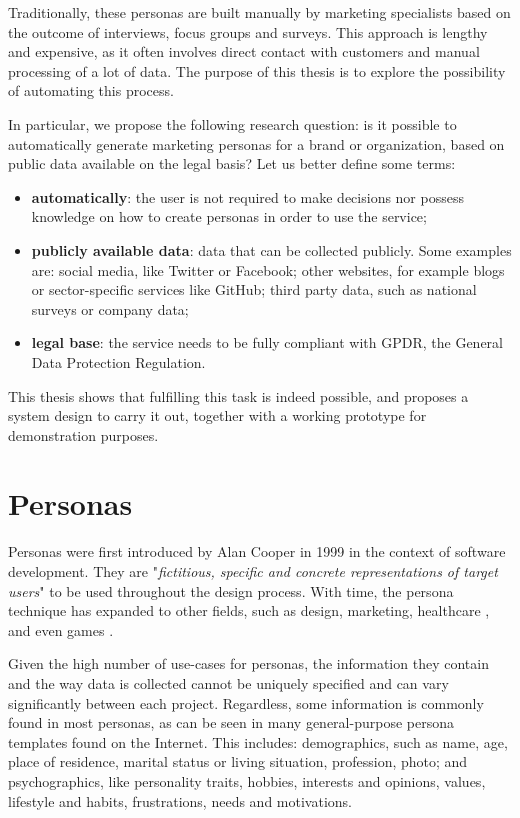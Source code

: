 Traditionally, these personas are built manually by marketing specialists based on the outcome of interviews, focus groups and surveys. This approach is lengthy and expensive, as it often involves direct contact with customers and manual processing of a lot of data. The purpose of this thesis is to explore the possibility of automating this process.

In particular, we propose the following research question: is it possible to automatically generate marketing personas for a brand or organization, based on public data available on the legal basis? Let us better define some terms:
\begin{itemize}
    \item \textbf{automatically}: the user is not required to make decisions nor possess knowledge on how to create personas in order to use the service;
    \item \textbf{publicly available data}: data that can be collected publicly. Some examples are: social media, like Twitter or Facebook; other websites, for example blogs or sector-specific services like GitHub; third party data, such as national surveys or company data;
    \item \textbf{legal base}: the service needs to be fully compliant with GPDR, the General Data Protection Regulation.
\end{itemize}

This thesis shows that fulfilling this task is indeed possible, and proposes a system design to carry it out, together with a working prototype for demonstration purposes.

\section{Personas}
\label{sec:personas}
Personas were first introduced by Alan Cooper in 1999 \cite{cooper2004inmates} in the context of software development. They are "\textit{fictitious, specific and concrete representations of target users}" \cite{pruitt2010persona} to be used throughout the design process. With time, the persona technique has expanded to other fields, such as design, marketing, healthcare \cite{vosbergen2015using}, and even games \cite{tychsen2008defining}.

Given the high number of use-cases for personas, the information they contain and the way data is collected cannot be uniquely specified and can vary significantly between each project. Regardless, some information is commonly found in most personas, as can be seen in many general-purpose persona templates found on the Internet. This includes: demographics, such as name, age, place of residence, marital status or living situation, profession, photo; and psychographics, like personality traits, hobbies, interests and opinions, values, lifestyle and habits, frustrations, needs and motivations.

